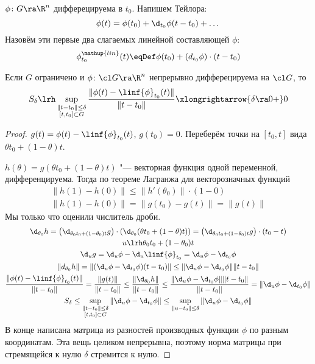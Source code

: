 \begin{Def}
	$\phi\colon G \ra \R^n$ дифферецируема в $t_0$.
	Напишем Тейлора:
	\[
		\phi(t) = \phi(t_0) + \d_{t_0} \phi(t - t_0) + \dots
	\]
	Назовём эти первые два слагаемых линейной составляющей $\phi$:
	\[
		\phi^{\mathup{lin}}_{t_0} (t) \eqDef \phi(t_0) + \left( d_{t_0} \phi \right) \cdot (t - t_0)
	\]
\end{Def}

\begin{lemma}
	Если $G$ ограничено и $\phi\colon \cl G \ra \R^n$ непрерывно дифферецируема на $\cl G$, то
	\[
		S_\delta \lrh \sup_{\substack{\|t-t_0\| \le \delta \\ [t, t_0] \subset G}} \frac{\|\phi(t) - \linf{\phi}_{t_0} (t)\|}{\|t-t_0\|} \xlongrightarrow{\delta \ra 0+} 0
	\]
\end{lemma}
\begin{proof}
	$g(t) = \phi(t) - \linf{\phi}_{t_0} (t)$, $g(t_0) = 0$.
	Переберём точки на $[t_0, t]$ вида $\theta t_0 + (1-\theta) t$.

	$h(\theta) = g(\theta t_0 + (1-\theta) t)$ "--- векторная функция одной переменной, дифференцируема.
	Тогда по теореме Лагранжа для векторозначных функций
	\begin{gather*}
		\|h(1) - h(0)\| \le \|h'(\theta_0)\| \cdot (1-0) \\
		\|h(1) - h(0)\| = \|g(t_0) - g(t)\| = \|g(t)\|
	\end{gather*}
	Мы только что оценили числитель дроби.
	\begin{gather*}
		\d_{\theta_0}h = \left(\d_{\theta_0 t_0 + (1-\theta_0) t} g\right) \cdot \left(\d_{\theta_0} (\theta t_0 + (1-\theta) t)\right)
			= \left(\d_{\theta_0 t_0 + (1-\theta_0) t} g\right) \cdot (t_0 - t) \\
		u \lrh \theta_0 t_0 + (1-\theta_0) t \\
		\d_u g = \d_u \phi - \d_u \linf{\phi}_{t_0} = \d_u \phi - \d_{t_0} \phi \\
		\|d_{\theta_0} h\| = \|(\d_u \phi - \d_{t_0} \phi)(t-t_0)\| \le \|\d_u \phi - \d_{t_0} \phi\| \|t-t_0\| \\
		\frac{\|\phi(t) - \linf{\phi}_{t_0} (t)\|}{\|t-t_0\|} = \frac{\|g(t)\|}{\|t-t_0\|} \le \frac{\|\d_{\theta_0} h\|}{\|t-t_0\|}
			\le \frac{\|\d_u \phi - \d_{t_0} \phi\| \|t-t_0\|}{\|t-t_0\|} = \|\d_u \phi - \d_{t_0} \phi\| \\
		S_\delta \le \sup_{\substack{\|t-t_0\| \le \delta \\ [t, t_0] \subset G}} \|\d_u \phi - \d_{t_0} \phi\|
			\le \sup_{\|u-t_0\|\le \delta} \|\d_u \phi - \d_{t_0} \phi\|
	\end{gather*}
	В конце написана матрица из разностей производных функции $\phi$ по разным координатам.
	Эта вещь целиком непрерывна, поэтому норма матрицы при стремящейся к нулю $\delta$ стремится к нулю.
\end{proof}

